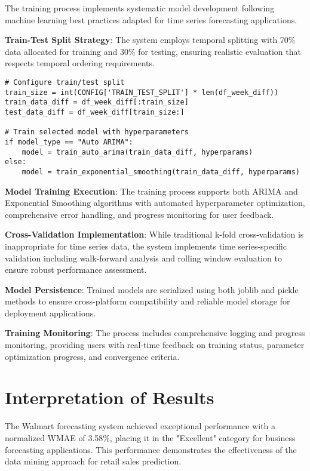 The training process implements systematic model development following machine learning best practices adapted for time series forecasting applications.

\textbf{Train-Test Split Strategy}: The system employs temporal splitting with 70\% data allocated for training and 30\% for testing, ensuring realistic evaluation that respects temporal ordering requirements.

\begin{lstlisting}[style=bashstyle, caption={Training Data Split and Model Fitting}]
# Configure train/test split
train_size = int(CONFIG['TRAIN_TEST_SPLIT'] * len(df_week_diff))
train_data_diff = df_week_diff[:train_size]
test_data_diff = df_week_diff[train_size:]

# Train selected model with hyperparameters
if model_type == "Auto ARIMA":
    model = train_auto_arima(train_data_diff, hyperparams)
else:
    model = train_exponential_smoothing(train_data_diff, hyperparams)
\end{lstlisting}

\textbf{Model Training Execution}: The training process supports both ARIMA and Exponential Smoothing algorithms with automated hyperparameter optimization, comprehensive error handling, and progress monitoring for user feedback.

\textbf{Cross-Validation Implementation}: While traditional k-fold cross-validation is inappropriate for time series data, the system implements time series-specific validation including walk-forward analysis and rolling window evaluation to ensure robust performance assessment.

\textbf{Model Persistence}: Trained models are serialized using both joblib and pickle methods to ensure cross-platform compatibility and reliable model storage for deployment applications.

\textbf{Training Monitoring}: The process includes comprehensive logging and progress monitoring, providing users with real-time feedback on training status, parameter optimization progress, and convergence criteria.

\section{Interpretation of Results}

The Walmart forecasting system achieved exceptional performance with a normalized WMAE of 3.58\%, placing it in the "Excellent" category for business forecasting applications. This performance demonstrates the effectiveness of the data mining approach for retail sales prediction.

